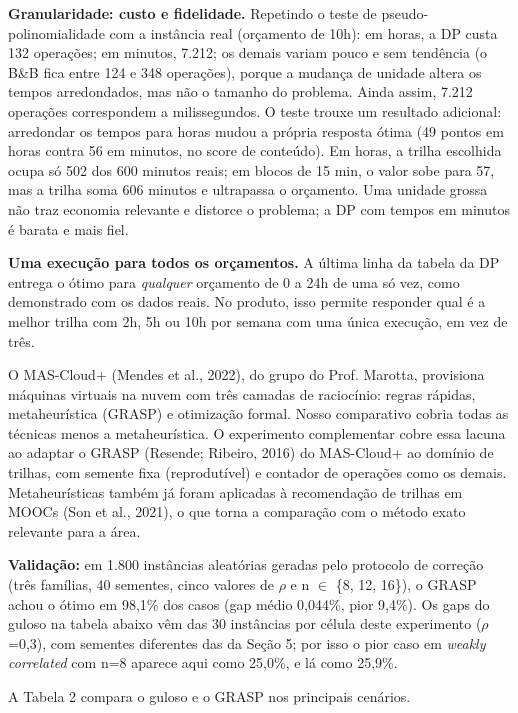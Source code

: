 \documentclass[12pt,a4paper]{article}
\newcommand{\secao}[1]{\par\vspace{1.2em}\noindent{\bfseries #1}\par\vspace{0.8em}\nopagebreak}
\begin{document}
\textbf{Granularidade: custo e fidelidade.} Repetindo o teste de pseudo-polinomialidade com a instância real (orçamento de 10h): em horas, a DP custa 132 operações; em minutos, 7.212; os demais variam pouco e sem tendência (o B\&B fica entre 124 e 348 operações), porque a mudança de unidade altera os tempos arredondados, mas não o tamanho do problema. Ainda assim, 7.212 operações correspondem a milissegundos. O teste trouxe um resultado adicional: arredondar os tempos para horas mudou a própria resposta ótima (49 pontos em horas contra 56 em minutos, no score de conteúdo). Em horas, a trilha escolhida ocupa só 502 dos 600 minutos reais; em blocos de 15 min, o valor sobe para 57, mas a trilha soma 606 minutos e ultrapassa o orçamento. Uma unidade grossa não traz economia relevante e distorce o problema; a DP com tempos em minutos é barata e mais fiel.

\textbf{Uma execução para todos os orçamentos.} A última linha da tabela da DP entrega o ótimo para \textit{qualquer} orçamento de 0 a 24h de uma só vez, como demonstrado com os dados reais. No produto, isso permite responder qual é a melhor trilha com 2h, 5h ou 10h por semana com uma única execução, em vez de três.

\secao{7 EXPERIMENTO COMPLEMENTAR: METAHEURÍSTICA GRASP}
O MAS-Cloud+ (Mendes et al., 2022), do grupo do Prof. Marotta, provisiona máquinas virtuais na nuvem com três camadas de raciocínio: regras rápidas, metaheurística (GRASP) e otimização formal. Nosso comparativo cobria todas as técnicas menos a metaheurística. O experimento complementar cobre essa lacuna ao adaptar o GRASP (Resende; Ribeiro, 2016) do MAS-Cloud+ ao domínio de trilhas, com semente fixa (reprodutível) e contador de operações como os demais. Metaheurísticas também já foram aplicadas à recomendação de trilhas em MOOCs (Son et al., 2021), o que torna a comparação com o método exato relevante para a área.

\textbf{Validação:} em 1.800 instâncias aleatórias geradas pelo protocolo de correção (três famílias, 40 sementes, cinco valores de \ensuremath{\rho} e n \ensuremath{\in} \{8, 12, 16\}), o GRASP achou o ótimo em 98,1\% dos casos (gap médio 0,044\%, pior 9,4\%). Os gaps do guloso na tabela abaixo vêm das 30 instâncias por célula deste experimento (\ensuremath{\rho}=0,3), com sementes diferentes das da Seção 5; por isso o pior caso em \textit{weakly correlated} com n=8 aparece aqui como 25,0\%, e lá como 25,9\%.

A Tabela 2 compara o guloso e o GRASP nos principais cenários.
\end{document}
